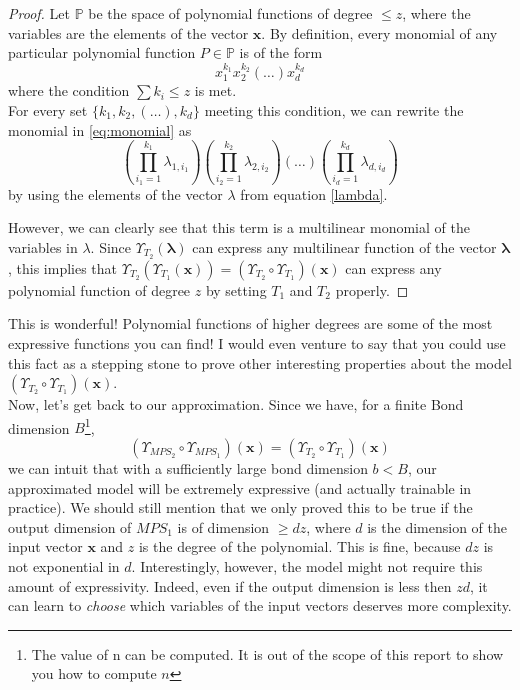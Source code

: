 \documentclass{article}
\theoremstyle{definition}
\theoremstyle{definition}
\begin{document}
\begin{proof}
Let $\mathbb{P}$ be the space of polynomial functions 
of degree $\leq z$, where the variables are the elements of the vector $\mathbf{x}$. By definition, every monomial of any particular polynomial function $P \in \mathbb{P}$ is of the form
\begin{equation}\label{eq:monomial}
    x_{1}^{k_1}x_{2}^{k_2}(\dots)x_{d}^{k_d}
\end{equation}
where the condition $\sum k_i \leq z$ is met. \\
For every set $\{k_1, k_2, (\dots), k_d\}$ meeting this condition,
we can rewrite the monomial in \ref{eq:monomial} as
\begin{equation}
    \left( \prod_{i_1=1}^{k_1}\lambda_{1, i_1} \right)
    \left( \prod_{i_2=1}^{k_2}\lambda_{2, i_2} \right)
    \left( \dots \right)
    \left( \prod_{i_d=1}^{k_d}\lambda_{d, i_d} \right)
\end{equation}
by using the elements of the vector $\lambda$ from equation \eqref{lambda}.

However, we can clearly see that this term is a multilinear 
monomial of the variables in $\lambda$. Since $\Upsilon_{T_2}(\bm{\lambda})$ can express any 
multilinear function of the vector $\bm{\lambda}$, this implies that $\Upsilon_{T_2}(\Upsilon_{T_1}(\bm{x})) = \left(\Upsilon_{T_2} \circ \Upsilon_{T_1}\right) (\mathbf{x})$ can express any polynomial function of degree $z$ by setting $T_1$ and $T_2$ properly.
\end{proof}


This is wonderful! Polynomial functions of higher degrees are some of the most expressive functions you can find! I would even venture to say that you could use this fact as a stepping stone to prove other interesting properties about the model $\left(\Upsilon_{T_2} \circ \Upsilon_{T_1}\right) (\mathbf{x})$. \\
Now, let's get back to our approximation. Since we have, for a finite Bond dimension $B$\footnote{The value of n can be computed. It is out of the scope of this report to show you how to compute $n$},
\[
    \left(\Upsilon_{MPS_2} \circ \Upsilon_{MPS_1}\right) (\mathbf{x})
    =
    \left(\Upsilon_{T_2} \circ \Upsilon_{T_1}\right) (\mathbf{x})
\]
we can intuit that with a sufficiently large bond dimension $b < B$, our approximated model will be extremely expressive (and actually trainable in practice).
We should still mention that we only proved this to be true if the output dimension of $MPS_1$ is of dimension $\geq dz$, where $d$ is the dimension of the input vector $\mathbf{x}$ and $z$ is the degree of the polynomial. This is fine, because $dz$ is not exponential in $d$. Interestingly, however, the model might not require this amount of expressivity. Indeed, even if the output dimension is less then $zd$, it can learn to \emph{choose} which variables of the input vectors deserves more complexity. \\
\end{document}
